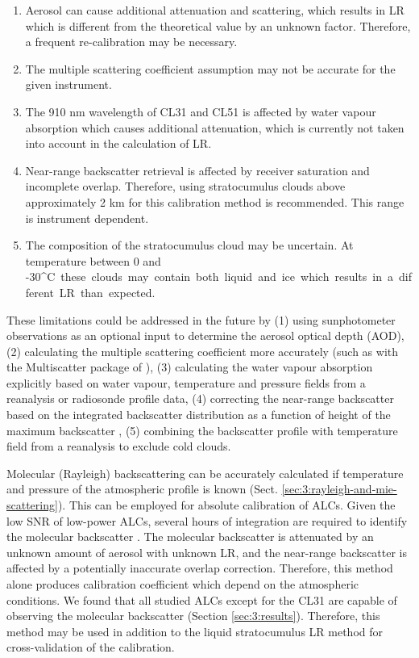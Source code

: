 \begin{enumerate}
\item Aerosol can cause additional attenuation and
scattering, which results in LR which is different from the theoretical
value by an unknown factor. Therefore, a frequent re-calibration may be
necessary.
\item The multiple scattering coefficient assumption may not be accurate for the given
instrument.
\item The 910 nm wavelength of CL31 and CL51 is affected by water vapour
absorption which causes additional attenuation, which is currently not taken
into account in the calculation of LR.
\item Near-range backscatter retrieval is affected by receiver saturation
and incomplete overlap. Therefore, using stratocumulus clouds above
approximately 2 km for this calibration method is recommended. This range
is instrument dependent.
\item The composition of the stratocumulus cloud may be uncertain.
At temperature between 0 and -30\unit{^\circ C} these clouds may contain both liquid and ice
which results in a different LR than expected.
\end{enumerate}

These limitations could be addressed in the future by (1) using sunphotometer
observations as an optional input to determine the aerosol optical depth (AOD),
(2) calculating the multiple
scattering coefficient more accurately (such as with the Multiscatter package of
\cite{hogan2006}), (3) calculating the water vapour absorption explicitly based
on water vapour, temperature and pressure fields from a reanalysis or
radiosonde profile data, (4) correcting the near-range backscatter based on
the integrated backscatter distribution as a function of height of the maximum backscatter \citep[Sect. 5.1]{hopkin2019}, (5)
combining the backscatter profile with temperature field from a reanalysis
to exclude cold clouds.

Molecular (Rayleigh) backscattering can be accurately calculated if temperature
and pressure of the atmospheric profile is known (Sect. \ref{sec:3:rayleigh-and-mie-scattering}). This can be employed for absolute
calibration of ALCs. Given the low SNR of low-power ALCs,
several hours of integration are required to identify the molecular
backscatter \citep{wiegner2014}. The molecular backscatter is attenuated by an unknown
amount of aerosol with unknown LR, and the near-range backscatter
is affected by a potentially inaccurate overlap correction. Therefore, this
method alone produces calibration coefficient which depend on the atmospheric
conditions. We found that all studied ALCs except for the CL31 are capable
of observing the molecular backscatter (Section \ref{sec:3:results}).
Therefore, this method may be used in addition to the liquid stratocumulus
LR method for cross-validation of the calibration.

